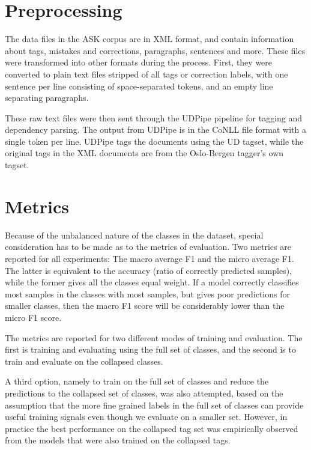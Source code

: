
\section{Preprocessing}

The data files in the ASK corpus are in XML format, and contain information
about tags, mistakes and corrections, paragraphs, sentences and more. These
files were transformed into other formats during the process. First, they
were converted to plain text files stripped of all tags or correction labels,
with one sentence per line consisting of space-separated tokens, and an empty
line separating paragraphs.

These raw text files were then sent through the UDPipe pipeline for tagging
and dependency parsing. The output from UDPipe is in the CoNLL file format
with a single token per line. UDPipe tags the documents using the UD tagset,
while the original tags in the XML documents are from the Oslo-Bergen
tagger's own tagset.

\section{Metrics}

Because of the unbalanced nature of the classes in the dataset, special
consideration has to be made as to the metrics of evaluation. Two metrics are
reported for all experiments: The macro average F1 and the micro average F1.
The latter is equivalent to the accuracy (ratio of correctly predicted
samples), while the former gives all the classes equal weight. If a model
correctly classifies most samples in the classes with most samples, but gives
poor predictions for smaller classes, then the macro F1 score will be
considerably lower than the micro F1 score.

The metrics are reported for two different modes of training and evaluation.
The first is training and evaluating using the full set of classes, and the
second is to train and evaluate on the collapsed classes.

A third option, namely to train on the full set of classes and reduce the
predictions to the collapsed set of classes, was also attempted, based on the
assumption that the more fine grained labels in the full set of classes can
provide useful training signals even though we evaluate on a smaller set.
However, in practice the best performance on the collapsed tag set was
empirically observed from the models that were also trained on the collapsed
tags.

